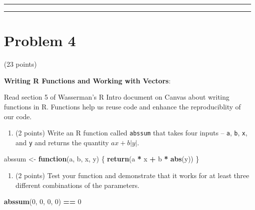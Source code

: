 \documentclass[]{article}
\newenvironment{Shaded}{\begin{snugshade}}{\end{snugshade}}
\newcommand{\ControlFlowTok}[1]{\textcolor[rgb]{0.13,0.29,0.53}{\textbf{#1}}}
\newcommand{\DecValTok}[1]{\textcolor[rgb]{0.00,0.00,0.81}{#1}}
\newcommand{\KeywordTok}[1]{\textcolor[rgb]{0.13,0.29,0.53}{\textbf{#1}}}
\newcommand{\NormalTok}[1]{#1}
\newcommand{\OperatorTok}[1]{\textcolor[rgb]{0.81,0.36,0.00}{\textbf{#1}}}
\newcommand{\StringTok}[1]{\textcolor[rgb]{0.31,0.60,0.02}{#1}}
\providecommand{\tightlist}{%
  \setlength{\itemsep}{0pt}\setlength{\parskip}{0pt}}
\begin{document}
\begin{center}\rule{0.5\linewidth}{\linethickness}\end{center}

\begin{center}\rule{0.5\linewidth}{\linethickness}\end{center}

\hypertarget{problem-4}{%
\section{Problem 4}\label{problem-4}}

(23 points)

\textbf{Writing R Functions and Working with Vectors}:

Read section 5 of Wasserman's R Intro document on Canvas about writing
functions in R. Functions help us reuse code and enhance the
reproduciblity of our code.

\begin{enumerate}
\def\labelenumi{\alph{enumi}.}
\tightlist
\item
  (2 points) Write an R function called \texttt{abssum} that takes four
  inputs -- \texttt{a}, \texttt{b}, \texttt{x}, and \texttt{y} and
  returns the quantity \(ax + b|y|\).
\end{enumerate}

\begin{Shaded}
\begin{Highlighting}[]
\NormalTok{abssum <-}\StringTok{ }\ControlFlowTok{function}\NormalTok{(a, b, x, y) \{}
    \KeywordTok{return}\NormalTok{(a }\OperatorTok{*}\StringTok{ }\NormalTok{x }\OperatorTok{+}\StringTok{ }\NormalTok{b }\OperatorTok{*}\StringTok{ }\KeywordTok{abs}\NormalTok{(y))}
\NormalTok{\}}
\end{Highlighting}
\end{Shaded}

\begin{enumerate}
\def\labelenumi{\alph{enumi}.}
\setcounter{enumi}{1}
\tightlist
\item
  (2 points) Test your function and demonstrate that it works for at
  least three different combinations of the parameters.
\end{enumerate}

\begin{Shaded}
\begin{Highlighting}[]
\KeywordTok{abssum}\NormalTok{(}\DecValTok{0}\NormalTok{, }\DecValTok{0}\NormalTok{, }\DecValTok{0}\NormalTok{, }\DecValTok{0}\NormalTok{) }\OperatorTok{==}\StringTok{ }\DecValTok{0}
\end{Highlighting}
\end{Shaded}
\end{document}
